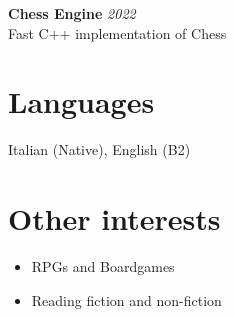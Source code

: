 \documentclass[a4paper,10pt]{article}
\begin{document}
\begin{minipage}[t]{0.33\textwidth}
        \textbf{Chess Engine} \hfill \textit{2022} \\
        Fast C++ implementation of Chess
        

    \section*{Languages}
        Italian (Native), English (B2)

    \section*{Other interests}
        \begin{itemize}[left=0.2cm, label={\textbullet}]
            \item RPGs and Boardgames
            \item Reading fiction and non-fiction
        \end{itemize}

\end{minipage}
\hfill
\end{document}
